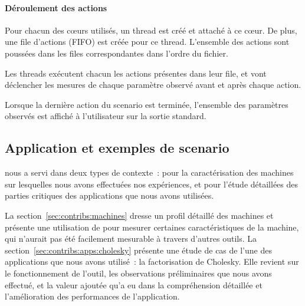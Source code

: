 \paragraph{Déroulement des actions}
Pour chacun des cœurs utilisés, un thread est créé et attaché à ce cœur. De plus, une file d'actions (FIFO) est créée pour ce thread.
L'ensemble des actions sont poussées dans les files correspondantes dans l'ordre du fichier.

Les threads exécutent chacun les actions présentes dans leur file, et vont déclencher les mesures de chaque paramètre observé avant et après chaque action.

Lorsque la dernière action du scenario est terminée, l'ensemble des paramètres observés est affiché à l'utilisateur sur la sortie standard.

\subsection{Application et exemples de scenario}

\outil nous a servi dans deux types de contexte~: pour la caractérisation des machines sur lesquelles nous avons effectuées nos expériences, et pour l'étude détaillées des parties critiques des applications que nous avons utilisées.

La section~\ref{sec:contribs:machines} dresse un profil détaillé des machines et présente une utilisation de \outil pour mesurer certaines caractéristiques de la machine, qui n'aurait pas été facilement mesurable à travers d'autres outils.
La section~\ref{sec:contribs:apps:cholesky} présente une étude de cas de l'une des applications que nous avons utilisé~: la factorisation de Cholesky.
Elle revient sur le fonctionnement de l'outil, les observations préliminaires que nous avons effectué, et la valeur ajoutée qu'a eu \outil dans la compréhension détaillée et l'amélioration des performances de l'application.



